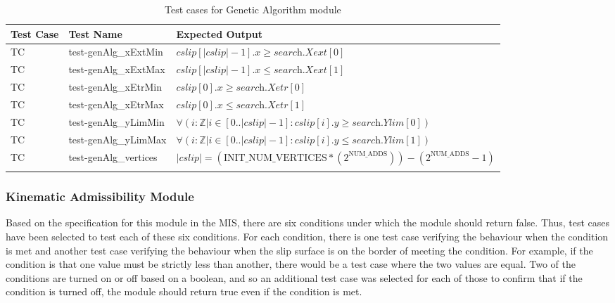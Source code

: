 \documentclass[12pt, titlepage]{article}
\newcounter{utestnum} %
\begin{document}
\begin{longtable}{  l  p{4cm}  p{6cm}  }
	\hline
	\textbf{Test Case} & \textbf{Test Name} & \textbf{Expected Output} \\
	\hline
	TC{utestnum}\theutestnum  \label{TC_GenAlgXextMin} & 
	test-genAlg\_xExtMin &  $\textit{cslip}[|\textit{cslip}|-1].x \geq 
	\textit{search.Xext}[0]$\\
	\hline 
	TC{utestnum}\theutestnum  \label{TC_GenAlgXextMax} & 
	test-genAlg\_xExtMax &  $\textit{cslip}[|\textit{cslip}|-1].x \leq 
	\textit{search.Xext}[1]$\\
	\hline 
	TC{utestnum}\theutestnum  \label{TC_GenAlgXetrMin} & 
	test-genAlg\_xEtrMin &  $\textit{cslip}[0].x \geq \textit{search.Xetr}[0]$\\
	\hline 
	TC{utestnum}\theutestnum  \label{TC_GenAlgXetrMax} & 
	test-genAlg\_xEtrMax &  $\textit{cslip}[0].x \leq \textit{search.Xetr}[1]$\\
	\hline 
	TC{utestnum}\theutestnum  \label{TC_GenAlgYlimMin} & 
	test-genAlg\_yLimMin &  $\forall(i : \mathbb{Z} | i \in 
	[0..|\textit{cslip}|-1] : \textit{cslip}[i].y \geq 
	\textit{search.Ylim}[0])$ \\
	\hline 
	TC{utestnum}\theutestnum  \label{TC_GenAlgYlimMax} & 
	test-genAlg\_yLimMax &  $\forall(i : \mathbb{Z} | i \in 
	[0..|\textit{cslip}|-1] : \textit{cslip}[i].y \leq 
	\textit{search.Ylim}[1])$ \\
	\hline
	TC{utestnum}\theutestnum  \label{TC_GenAlgVertices} & 
	test-genAlg\_vertices &  $|\textit{cslip}| = 
	(\text{INIT\_NUM\_VERTICES}*(2^\text{NUM\_ADDS}))-(2^\text{NUM\_ADDS}-1)$ 
	\\
	\hline
	\caption{Test cases for Genetic Algorithm module}
	\label{GenAlgTests}
\end{longtable}

\subsubsection{Kinematic Admissibility Module}

Based on the specification for this module in the MIS, there are six conditions 
under which the module should return false. Thus, test cases have been selected 
to test each of these six conditions. For each condition, there is one test 
case verifying the behaviour when the condition is met and another test case 
verifying the behaviour when the slip surface is on the border of meeting the 
condition. For example, if the condition is that one value must be strictly 
less than another, there would be a test case where the two values are equal. 
Two of the conditions are turned on or off based on a boolean, and so an 
additional test case was selected for each of those to confirm that if the 
condition is turned off, the module should return true even if the condition is 
met. 
\end{document}
